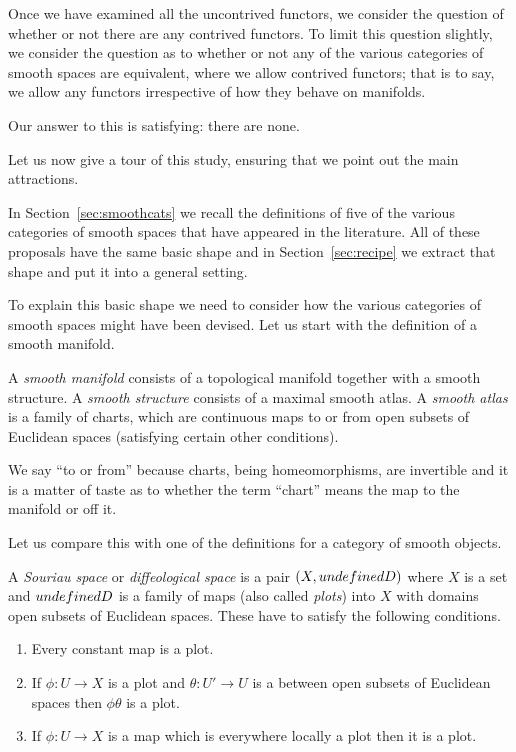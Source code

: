 \documentclass[%
a4paper,%
arxiv,%
defaults
]{myclass}
\begin{document}
Once we have examined all the uncontrived functors, we consider the question of whether or not there are any contrived functors.
To limit this question slightly, we consider the question as to whether or not any of the various categories of smooth spaces are equivalent, where we allow contrived functors; that is to say, we allow any functors irrespective of how they behave on manifolds.

Our answer to this is satisfying: there are none.

\medskip

Let us now give a tour of this study, ensuring that we point out the main attractions.

In Section~\ref{sec:smoothcats} we recall the definitions of five of the various categories of smooth spaces that have appeared in the literature.
All of these proposals have the same basic shape and in Section~\ref{sec:recipe} we extract that shape and put it into a general setting.

To explain this basic shape we need to consider how the various categories of smooth spaces might have been devised.
Let us start with the definition of a smooth manifold.

\begin{defn}
A \emph{smooth manifold} consists of a topological manifold together with a smooth structure.
A \emph{smooth structure} consists of a maximal smooth atlas.
A \emph{smooth atlas} is a family of charts, which are continuous maps to or from open subsets of Euclidean spaces (satisfying certain other conditions).
\end{defn}

We say ``to or from'' because charts, being homeomorphisms, are invertible and it is a matter of taste as to whether the term ``chart'' means the map to the manifold or off it.

Let us compare this with one of the definitions for a category of smooth objects.

\begin{defn}
 A \emph{Souriau space} or \emph{diffeological space} is a pair \((X, \m{D})\) where \(X\) is a set and \(\m{D}\) is a family of maps (also called \emph{plots}) into \(X\) with domains open subsets of Euclidean spaces.
 These have to satisfy the following conditions.
 \begin{enumerate}
 \item
  Every constant map is a plot.
 \item
  If \(\phi \colon U \to X\) is a plot and
   \(\theta \colon U' \to U\)
  is a \cimap between open subsets of Euclidean spaces then \(\phi\theta\) is a plot.
 \item
  If \(\phi \colon U \to X\) is a map which is everywhere locally a plot then it is a plot.
 \end{enumerate}
\end{defn}
\end{document}
